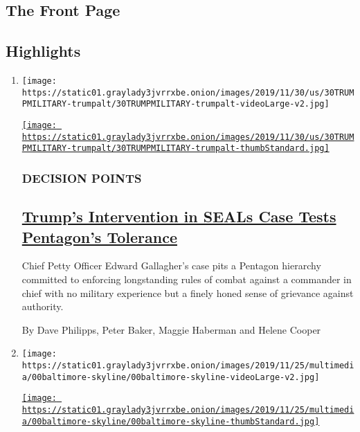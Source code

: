 \hypertarget{the-front-page}{%
\subsection{The Front Page}\label{the-front-page}}

\hypertarget{highlights}{%
\subsection{Highlights}\label{highlights}}

\begin{enumerate}
\def\labelenumi{\arabic{enumi}.}
\item
  \texttt{[image: https://static01.graylady3jvrrxbe.onion/images/2019/11/30/us/30TRUMPMILITARY-trumpalt/30TRUMPMILITARY-trumpalt-videoLarge-v2.jpg]}

  \href{/2019/11/30/us/politics/trump-seals-eddie-gallagher.html}{\texttt{[image: https://static01.graylady3jvrrxbe.onion/images/2019/11/30/us/30TRUMPMILITARY-trumpalt/30TRUMPMILITARY-trumpalt-thumbStandard.jpg]}}

  \hypertarget{decision-points}{%
  \subsubsection{DECISION POINTS}\label{decision-points}}

  \hypertarget{trumps-intervention-in-seals-case-tests-pentagons-tolerance}{%
  \subsection{\texorpdfstring{\href{/2019/11/30/us/politics/trump-seals-eddie-gallagher.html}{Trump's
  Intervention in SEALs Case Tests Pentagon's
  Tolerance}}{Trump's Intervention in SEALs Case Tests Pentagon's Tolerance}}\label{trumps-intervention-in-seals-case-tests-pentagons-tolerance}}

  Chief Petty Officer Edward Gallagher's case pits a Pentagon hierarchy
  committed to enforcing longstanding rules of combat against a
  commander in chief with no military experience but a finely honed
  sense of grievance against authority.

  By Dave Philipps, Peter Baker, Maggie Haberman and Helene Cooper
\item
  \texttt{[image: https://static01.graylady3jvrrxbe.onion/images/2019/11/25/multimedia/00baltimore-skyline/00baltimore-skyline-videoLarge-v2.jpg]}

  \href{/2019/11/30/business/amazon-baltimore.html}{\texttt{[image: https://static01.graylady3jvrrxbe.onion/images/2019/11/25/multimedia/00baltimore-skyline/00baltimore-skyline-thumbStandard.jpg]}}


\end{enumerate}
